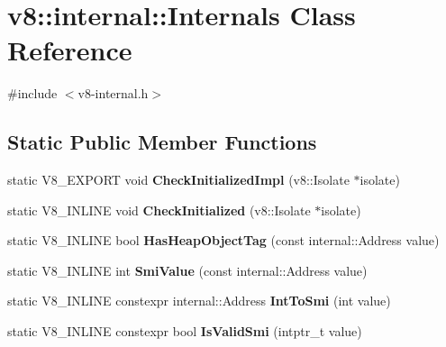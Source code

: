 \hypertarget{classv8_1_1internal_1_1Internals}{}\section{v8\+:\+:internal\+:\+:Internals Class Reference}
\label{classv8_1_1internal_1_1Internals}


{\ttfamily \#include $<$v8-\/internal.\+h$>$}

\subsection*{Static Public Member Functions}
\begin{DoxyCompactItemize}
\item 
\mbox{\label{classv8_1_1internal_1_1Internals_ac5141eba7a786f0fa9f6db658f25d4ba}} 
static V8\+\_\+\+E\+X\+P\+O\+RT void {\bfseries Check\+Initialized\+Impl} (v8\+::\+Isolate $\ast$isolate)
\item 
\mbox{\label{classv8_1_1internal_1_1Internals_a1aa4bc86bc011f055fe27d18e0849b8c}} 
static V8\+\_\+\+I\+N\+L\+I\+NE void {\bfseries Check\+Initialized} (v8\+::\+Isolate $\ast$isolate)
\item 
\mbox{\label{classv8_1_1internal_1_1Internals_adcdb38643eb538a720dbee4e77acea15}} 
static V8\+\_\+\+I\+N\+L\+I\+NE bool {\bfseries Has\+Heap\+Object\+Tag} (const internal\+::\+Address value)
\item 
\mbox{\label{classv8_1_1internal_1_1Internals_a7489b2097139fa3f9dca4006178d7c0d}} 
static V8\+\_\+\+I\+N\+L\+I\+NE int {\bfseries Smi\+Value} (const internal\+::\+Address value)
\item 
\mbox{\label{classv8_1_1internal_1_1Internals_ae78e94e88a1205fa9133434e60c7fcae}} 
static V8\+\_\+\+I\+N\+L\+I\+NE constexpr internal\+::\+Address {\bfseries Int\+To\+Smi} (int value)
\item 
\mbox{\label{classv8_1_1internal_1_1Internals_a1d1d3013de2280bfd115a2600111714a}} 
static V8\+\_\+\+I\+N\+L\+I\+NE constexpr bool {\bfseries Is\+Valid\+Smi} (intptr\+\_\+t value)

\end{DoxyCompactItemize}
